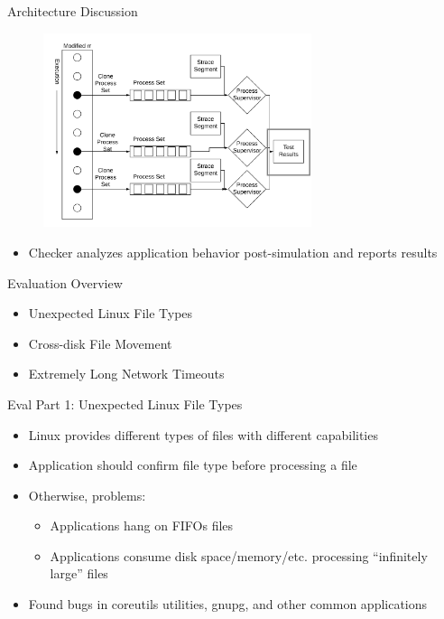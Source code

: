 \documentclass[pdf]{beamer}
\begin{document}
\begin{frame}{Architecture Discussion}
  \begin{figure}
    \centering
    \includegraphics[width = 0.7\textwidth]{images/architecture_checker_results}
  \end{figure}
  \begin{itemize}
    \item{Checker analyzes application behavior post-simulation and reports
      results}
  \end{itemize}
\end{frame}


\begin{frame}{Evaluation Overview}
  \begin{itemize}
    \item{Unexpected Linux File Types}
    \item{Cross-disk File Movement}
    \item{Extremely Long Network Timeouts}
  \end{itemize}
\end{frame}



\begin{frame}{Eval Part 1: Unexpected Linux File Types}
  \begin{itemize}
    \item{Linux provides different types of files with different capabilities}
    \item{Application should confirm file type before processing a file}
    \item{Otherwise, problems:}
      \begin{itemize}
        \item{Applications hang on FIFOs files}
        \item{Applications consume disk space/memory/etc. processing ``infinitely
          large'' files}
      \end{itemize}
    \item{Found bugs in coreutils utilities, gnupg, and other common
        applications}
  \end{itemize}
\end{frame}
\end{document}
